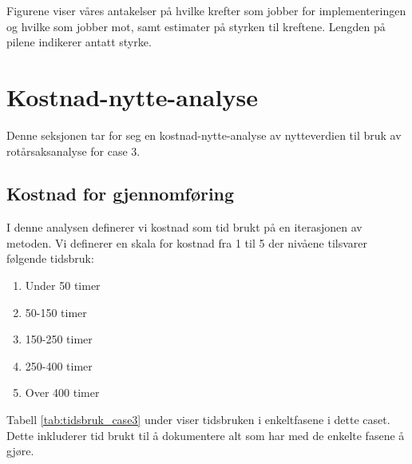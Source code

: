 Figurene viser våres antakelser på hvilke krefter som jobber for implementeringen og hvilke som jobber mot, samt estimater på styrken til kreftene. Lengden på pilene indikerer antatt styrke. 
\section{Kostnad-nytte-analyse}
\label{kost-nytte-case3}
Denne seksjonen tar for seg en kostnad-nytte-analyse av nytteverdien til bruk av rotårsaksanalyse for case 3. 

\subsection{Kostnad for gjennomføring}
I denne analysen definerer vi kostnad som tid brukt på en iterasjonen av metoden. Vi definerer en skala for kostnad fra 1 til 5 der nivåene tilsvarer følgende tidsbruk:

\begin{enumerate}
    \item Under 50 timer
    \item 50-150 timer
    \item 150-250 timer
    \item 250-400 timer
    \item Over 400 timer
\end{enumerate}

Tabell \ref{tab:tidsbruk_case3} under viser tidsbruken i enkeltfasene i dette caset. Dette inkluderer tid brukt til å dokumentere alt som har med de enkelte fasene å gjøre. 

